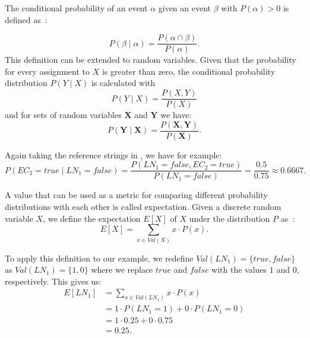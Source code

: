\bigskip

The \gls{conditional probability} of an \gls{event} $\alpha$ given an \gls{event} $\beta$ with $P(\alpha)>0$ is defined as~\cite{koller2009probabilistic}:

\begin{equation}
\label{equ:conditional-probability-event}
P(\beta\mid\alpha) = \frac{P(\alpha\cap\beta)}{P(\alpha)}.
\end{equation}
This definition can be extended to \glspl{random variable}.
Given that the probability for every \gls{assignment} to $X$ is greater than zero, the \gls{conditional probability distribution} $P(Y\mid X)$ is calculated with
\begin{equation}
\label{equ:conditional-probability-random-variable}
P(Y\mid X) = \frac{P(X,Y)}{P(X)}
\end{equation}
and for sets of \glspl{random variable} $\mathbf{X}$ and $\mathbf{Y}$ we have:
\begin{equation}
\label{equ:conditional-probability-random-variable}
P(\mathbf{Y}\mid \mathbf{X}) = \frac{P(\mathbf{X},\mathbf{Y})}{P(\mathbf{X})}.
\end{equation}

Again taking the reference strings in , we have for example:
\begin{equation*}
  P(EC_2{=}\mathit{true}\mid LN_1{=}\mathit{false})=\frac{P(LN_1{=}\mathit{false}, EC_2{=}\mathit{true})}{P(LN_1{=}\mathit{false})}=\frac{0.5}{0.75}\approx0.6667.
\end{equation*}

\bigskip

A value that can be used as a metric for comparing different \glspl{probability distribution} with each other is called \gls{expectation}.
Given a discrete \gls{random variable} $X$, we define the expectation $E[X]$ of $X$ under the distribution $P$ as~\cite{koller2009probabilistic}:
\begin{equation}
  \label{equ:expectation-x}
  E[X]=\sum_{x\in \mathit{Val}(X)} x\cdot P(x).
\end{equation}

To apply this definition to our example, we redefine $\mathit{Val}(LN_1)=\{\mathit{true},\mathit{false}\}$ as $\mathit{Val}(LN_1)=\{1,0\}$ where we replace $\mathit{true}$ and $\mathit{false}$ with the values $1$ and $0$, respectively.
This gives us:
\begin{equation*}
  \begin{split}
  \label{equ:expectation-x}
  E[LN_1]&=\sum_{x\in \mathit{Val}(LN_1)} x\cdot P(x)\\
  &=1\cdot P(LN_1{=}1)+0\cdot P(LN_1{=}0)\\
  &=1\cdot 0.25+0\cdot 0.75\\
  &=0.25.
  \end{split}
\end{equation*}


